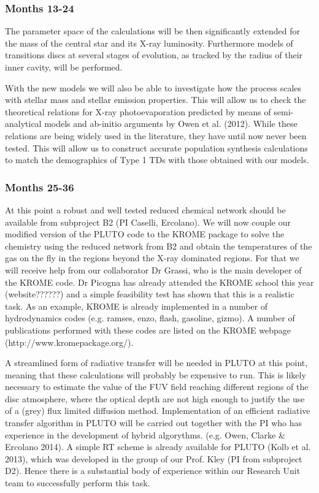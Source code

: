 \documentclass[10pt,fleqn,twoside]{article}
\begin{document}
\subsubsection{Months 13-24}

The parameter space of the calculations will be then
significantly extended for the mass of the central star and its X-ray
luminosity. Furthermore models of transitions discs at several stages
of evolution, as tracked by the radius of their inner cavity, will be
performed. 

With the new models we will also be able to investigate how
the process scales with stellar mass and stellar emission
properties. This will allow us to check the
theoretical relations for X-ray photoevaporation 
predicted by means of semi-analytical models and ab-initio arguments
by Owen et al. (2012). While these relations are being widely used in
the literature, they have until now never been tested. This will allow
us to construct accurate population synthesis calculations to match
the demographics of Type 1 TDs with those obtained with our models.\\

\subsubsection{Months 25-36} 
At this point a robust and well tested reduced chemical network should
be available from subproject B2 (PI Caselli, Ercolano). 
We will now couple our modified version of the PLUTO code to the
KROME package to solve the chemistry using the reduced network from B2
and obtain the temperatures of
the gas on the fly in the regions beyond the X-ray
dominated regions. For that we will receive help from our collaborator
Dr Grassi, who is the main developer of the KROME code. Dr Picogna has
already attended the KROME school this year (website??????) and a simple
feasibility test has shown that this is a realistic task. As an
example, KROME is already implemented in a number of hydrodynamics
codes (e.g. {\sc ramses, enzo, flash, gasoline, gizmo}). A number of
publications performed with these codes are listed on the KROME
webpage (http://www.kromepackage.org/).

A streamlined form of radiative transfer
will be needed in PLUTO at this point, meaning that these calculations will
probably be expensive to run.  This is likely necessary to estimate the value of the  FUV field
reaching different regions of the disc atmosphere, where the optical
depth are not high enough to justify the use of a  (grey) flux
limited diffusion method.  Implementation of an efficient
radiative transfer algorithm in PLUTO will be carried out together
with the PI who has experience in the development of hybrid
algorythms. (e.g. Owen, Clarke \& Ercolano 2014). A simple RT scheme is
already available for PLUTO (Kolb et al. 2013), which was developed in
the group of our Prof. Kley (PI from subproject D2). Hence there is
a substantial body of experience within our Research Unit team to
successfully perform this task.
\end{document}
